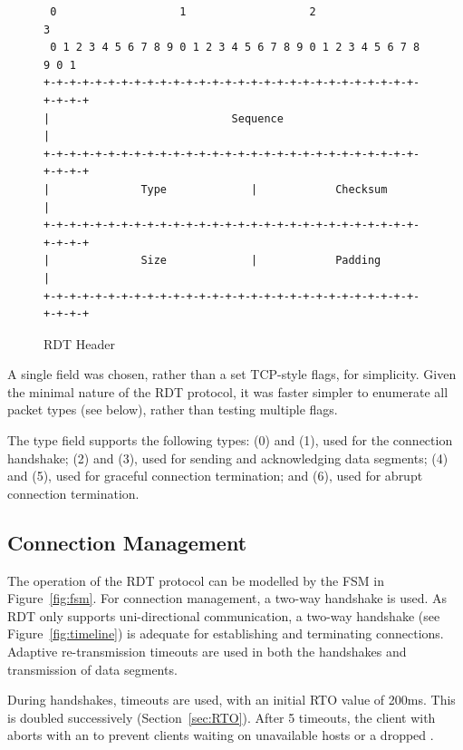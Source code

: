 \begin{figure}
\begin{center}
\begin{verbatim}
 0                   1                   2                   3  
 0 1 2 3 4 5 6 7 8 9 0 1 2 3 4 5 6 7 8 9 0 1 2 3 4 5 6 7 8 9 0 1
+-+-+-+-+-+-+-+-+-+-+-+-+-+-+-+-+-+-+-+-+-+-+-+-+-+-+-+-+-+-+-+-+
|                            Sequence                           |
+-+-+-+-+-+-+-+-+-+-+-+-+-+-+-+-+-+-+-+-+-+-+-+-+-+-+-+-+-+-+-+-+
|              Type             |            Checksum           |
+-+-+-+-+-+-+-+-+-+-+-+-+-+-+-+-+-+-+-+-+-+-+-+-+-+-+-+-+-+-+-+-+
|              Size             |            Padding            |
+-+-+-+-+-+-+-+-+-+-+-+-+-+-+-+-+-+-+-+-+-+-+-+-+-+-+-+-+-+-+-+-+
\end{verbatim}
\end{center}
\caption{RDT Header}\label{fig:header}
\end{figure}

A single  field was chosen, rather than a set TCP-style flags, for simplicity. Given the minimal nature of the RDT protocol, it was faster simpler to enumerate all packet types (see below), rather than testing multiple flags.

The type field supports the following types:  (0) and  (1), used for the connection handshake;  (2) and  (3), used for sending and acknowledging data segments;  (4) and  (5), used for graceful connection termination; and  (6), used for abrupt connection termination.

\subsection{Connection Management}

The operation of the RDT protocol can be modelled by the FSM in Figure~\ref{fig:fsm}. For connection management, a two-way handshake is used. As RDT only supports uni-directional communication, a two-way handshake (see Figure~\ref{fig:timeline}) is adequate for establishing and terminating connections. Adaptive re-transmission timeouts are used in both the handshakes and transmission of data segments.

During handshakes, timeouts are used, with an initial RTO value of 200ms. This is doubled successively (Section~\ref{sec:RTO}). After 5 timeouts, the client with aborts with an  to prevent clients waiting on unavailable hosts or a dropped .

